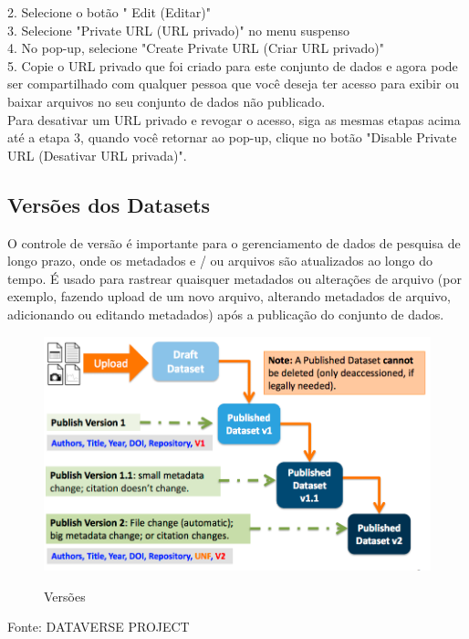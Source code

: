 \documentclass[12pt,hidelinks]{article}
\begin{document}
2. Selecione o botão " Edit (Editar)"\\

3. Selecione "Private URL (URL privado)" no menu suspenso\\

4. No pop-up, selecione "Create Private URL (Criar URL privado)"\\

5. Copie o URL privado que foi criado para este conjunto de dados e agora pode ser compartilhado com qualquer pessoa que você deseja ter acesso para exibir ou baixar arquivos no seu conjunto de dados não publicado.\\

Para desativar um URL privado e revogar o acesso, siga as mesmas etapas acima até a etapa 3, quando você retornar ao pop-up, clique no botão "Disable Private URL (Desativar URL privada)".
    
    \subsection{Versões dos Datasets}
    
\qquad O controle de versão é importante para o gerenciamento de dados de pesquisa de longo prazo, onde os metadados e / ou arquivos são atualizados ao longo do tempo. É usado para rastrear quaisquer metadados ou alterações de arquivo (por exemplo, fazendo upload de um novo arquivo, alterando metadados de arquivo, adicionando ou editando metadados) após a publicação do conjunto de dados.

\begin{figure}[H]
    \caption{Versões}
    \centering
      \includegraphics[scale=0.4]{imagens/ver.png}
    \label{Versão}
 \end{figure}
\noindent Fonte: DATAVERSE PROJECT\\
    
\end{document}
